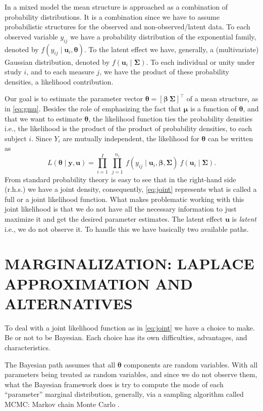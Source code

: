 In a mixed model the mean structure is approached as a combination of
probability distributions. It is a combination since we have to assume
probabilistic structures for the observed and non-observed/latent data.
To each observed variable \(y_{ij}\) we have a probability distribution
of the exponential family, denoted by \(f(y_{ij} \mid \bm{u}_{i},
\bm{\theta})\). To the latent effect we have, generally, a
(multivariate) Gaussian distribution, denoted by \(f(\bm{u}_{i} \mid
\bm{\Sigma})\). To each individual or unity under study \(i\), and to
each measure \(j\), we have the product of these probability densities,
a likelihood contribution.

Our goal is to estimate the parameter vector \(\bm{\theta} =
[\bm{\beta~\Sigma}]^{\top}\) of a mean structure, as in
\autoref{eq:gmu}. Besides the role of emphasizing the fact that
\(\bm{\mu}\) is a function of \(\bm{\theta}\), and that we want to
estimate \(\bm{\theta}\), the likelihood function ties the probability
densities i.e., the likelihood is the product of the product of
probability densities, to each subject \(i\). Since \(Y_{i}\) are
mutually independent, the likelihood for \(\bm{\theta}\) can be written
as
\begin{equation}
 L(\bm{\theta} \mid \bm{y,u}) =
 \prod_{i=1}^{I}~\prod_{j=1}^{n_{i}}~
 f(y_{ij} \mid \bm{u}_{i}, \bm{\beta,\Sigma})~
 f(\bm{u}_{i} \mid \bm{\Sigma}).
 \label{eq:joint}
\end{equation}
From standard probability theory is easy to see that in the right-hand
side (r.h.s.) we have a joint density, consequently, \autoref{eq:joint}
represents what is called a full or a joint likelihood function. What
makes problematic working with this joint likelihood is that we do not
have all the necessary information to just maximize it and get the
desired parameter estimates. The latent effect \(\bm{u}\) is
\textit{latent} i.e., we do not observe it. To handle this we have
basically two available paths.

\section{MARGINALIZATION: LAPLACE APPROXIMATION AND ALTERNATIVES}
\label{cap:laplace}

To deal with a joint likelihood function as in \autoref{eq:joint} we
have a choice to make. Be or not to be Bayesian. Each choice has its own
difficulties, advantages, and characteristics.

The Bayesian path assumes that all \(\bm{\theta}\) components are random
variables. With all parameters being treated as random variables, and
since we do not observe them, what the Bayesian framework does is try to
compute the mode of each ``parameter'' marginal distribution, generally,
via a sampling algorithm called MCMC: Markov chain Monte Carlo
\cite{MCMC, Diaconis}.

